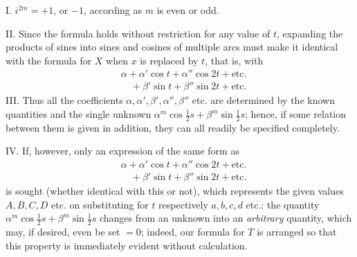 I. $i^{2m}=+1$, or $-1$, according as $m$ is even or odd.

II. Since the formula holds without restriction for any value of $t$, expanding the products of sines into sines and cosines of multiple arcs must make it
identical with the formula
for $X$ when $x$ is replaced by $t$, that is, with
\[
\begin{aligned}
&\alpha+\alpha'\cos t+\alpha''\cos2t+\text{etc.}\\[5pt]
&\quad+\beta'\sin t+\beta''\sin2t+\text{etc.}
\end{aligned}
\]
III. Thus all the coefficients $\alpha,\alpha',\beta',\alpha'',\beta''$ etc. are determined by the known quantities and the single unknown
$\alpha^m\cos\tfrac12s+\beta^m\sin\tfrac12s$; hence, if
some relation between them is given in addition, they can all readily be specified completely.
\par{}
IV. If, however, only an expression of the same form as
\[
\begin{aligned}
&\alpha+\alpha'\cos t+\alpha''\cos2t+\text{etc.}\\[5pt]
&\quad+\beta'\sin t+\beta''\sin2t+\text{etc.}
\end{aligned}
\]
is sought (whether identical with this or not), which represents the given values
$A,B,C,D$ etc. on substituting for $t$ respectively $a,b,c,d$ etc.: the quantity
$\alpha^m\cos\tfrac12s+\beta^m\sin\tfrac12s$ changes from an unknown into an \emph{arbitrary} quantity, which may, if desired, even be set $=0$;
indeed, our formula for $T$ is arranged so that this property is immediately evident without
calculation.

\endgroup
